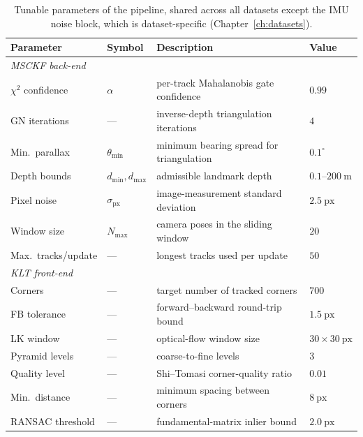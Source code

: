 \begin{table}[htbp]
\centering
\caption{Tunable parameters of the pipeline, shared across all datasets except the IMU noise block, which is dataset-specific (Chapter~\ref{ch:datasets}).}
\label{tab:m_params}
\begin{tabular}{llll}
\toprule
\textbf{Parameter} & \textbf{Symbol} & \textbf{Description} & \textbf{Value} \\
\midrule
\multicolumn{4}{l}{\emph{MSCKF back-end}} \\
$\chi^2$ confidence   & $\alpha$              & per-track Mahalanobis gate confidence        & $0.99$ \\
GN iterations         & ---                   & inverse-depth triangulation iterations       & $4$ \\
Min.\ parallax        & $\theta_{\min}$       & minimum bearing spread for triangulation     & $0.1^{\circ}$ \\
Depth bounds          & $d_{\min}, d_{\max}$  & admissible landmark depth                    & $0.1$--$200~\mathrm{m}$ \\
Pixel noise           & $\sigma_{\mathrm{px}}$& image-measurement standard deviation         & $2.5~\mathrm{px}$ \\
Window size           & $N_{\max}$            & camera poses in the sliding window           & $20$ \\
Max.\ tracks/update   & ---                   & longest tracks used per update               & $50$ \\
\midrule
\multicolumn{4}{l}{\emph{KLT front-end}} \\
Corners               & ---                   & target number of tracked corners             & $700$ \\
FB tolerance          & ---                   & forward--backward round-trip bound           & $1.5~\mathrm{px}$ \\
LK window             & ---                   & optical-flow window size                     & $30 \times 30~\mathrm{px}$ \\
Pyramid levels        & ---                   & coarse-to-fine levels                        & $3$ \\
Quality level         & ---                   & Shi--Tomasi corner-quality ratio             & $0.01$ \\
Min.\ distance        & ---                   & minimum spacing between corners              & $8~\mathrm{px}$ \\
RANSAC threshold      & ---                   & fundamental-matrix inlier bound              & $2.0~\mathrm{px}$ \\

\end{tabular}
\end{table}
